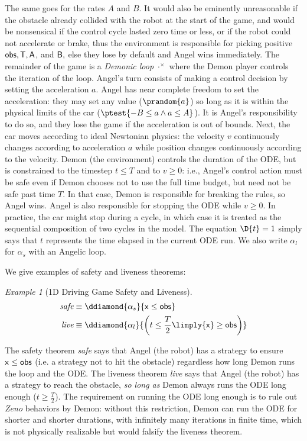 \documentclass[12pt]{cmuthesis}
\theoremstyle{definition}
\theoremstyle{remark}
\newtheorem{example}{Example}
\newcommand{\obsvar}{{\sf obs}\xspace}
\newcommand{\Tvar}{{\sf T}\xspace}
\newcommand{\Avar}{{\sf A}\xspace}
\newcommand{\Bvar}{{\sf B}\xspace}
\newcommand{\xvar}{{\sf x}\xspace}
\begin{document}
The same goes for the rates $A$ and $B$.
It would also be eminently unreasonable if the obstacle already collided with the robot at the start of the game, and would be nonsensical if the control cycle lasted zero time or less, or if the robot could not accelerate or brake, thus the environment is responsible for picking positive $\obsvar, \Tvar, \Avar$, and  $\Bvar,$ else they lose by default and Angel wins immediately.
The remainder of the game is a \emph{Demonic loop} $\cdot^\times$ where the Demon player controls the iteration of the loop.
Angel's turn consists of making a control decision by setting the acceleration $a$.
Angel has near complete freedom to set the acceleration: they may set any value ($\prandom{a}$) so long as it is within the physical limits of the car ($\ptest{-B \leq a \land a \leq A}$).
It is Angel's responsibility to do so, and they lose the game if the acceleration is out of bounds.
Next, the car moves according to ideal Newtonian physics: the velocity $v$ continuously changes according to acceleration $a$ while position changes continuously according to the velocity.
Demon (the environment) controls the duration of the ODE, but is constrained to the timestep $t \leq T$ and to $v \geq 0$: i.e., Angel's control action must be safe even if Demon chooses not to use the full time budget, but need not be safe past time $T$. In that case, Demon is responsible for breaking the rules, so Angel wins.
Angel is also responsible for stopping the ODE while $v \geq 0$.
In practice, the car might stop during a cycle, in which case it is treated as the sequential composition of two cycles in the model.
The equation $\D{t}=1$ simply says that $t$ represents the time elapsed in the current ODE run.
We also write $\alpha_l$ for $\alpha_s$ with an Angelic loop.

We give examples of safety and liveness theorems:
\begin{example}[1D Driving Game Safety and Liveness]
  \begin{align*}
    \textit{safe} &\equiv \ddiamond{\alpha_s}{\xvar \leq \obsvar}\\
    \textit{live} &\equiv \ddiamond{\alpha_l}{\left(t \leq \frac{T}{2} \limply \xvar \geq \obsvar \right)}
  \end{align*}
\end{example}
The safety theorem \emph{safe} says that Angel (the robot) has a strategy to ensure $\xvar \leq \obsvar$ (i.e. a strategy not to hit the obstacle) regardless how long Demon runs the loop and the ODE.
The liveness theorem \emph{live} says that Angel (the robot) has a strategy to reach the obstacle, \emph{so long as} Demon always runs the ODE long enough ($t \geq \frac{T}{2}$).
The requirement on running the ODE long enough is to rule out \emph{Zeno} behaviors by Demon: without this restriction, Demon can run the ODE for shorter and shorter durations, with infinitely many iterations in finite time, which is not physically realizable but would falsify the liveness theorem.
\end{document}
